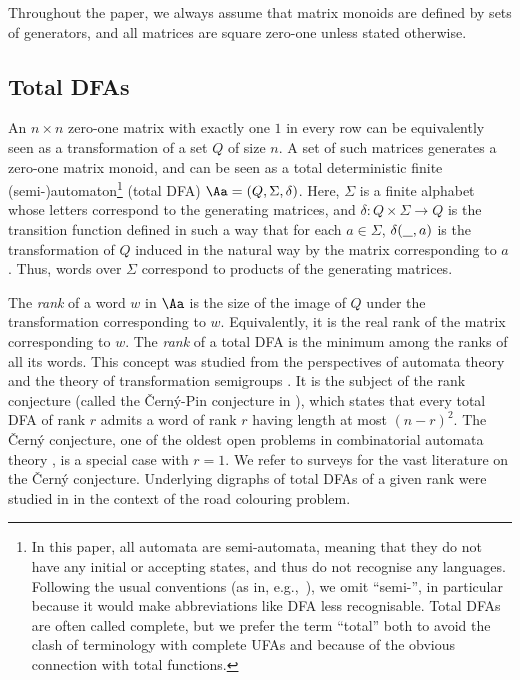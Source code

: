 
Throughout the paper, we always assume that matrix monoids are defined by sets of generators, and 
all matrices are square zero-one unless stated otherwise.

\subsection{Total DFAs}

An $n \times n$ zero-one matrix with exactly one $1$ in every row can be equivalently seen as a transformation of a set $Q$ of size $n$. A set of such matrices generates a zero-one matrix monoid, and can be seen as a total deterministic finite (semi-)automaton\footnote{\label{footnote-semi}In this paper, all automata are semi-automata, meaning that they do not have any initial or accepting states, and thus do not recognise any languages. Following the usual conventions (as in, e.g.,~\cite{Berstel2010}), we omit ``semi-'', in particular because it would make abbreviations like DFA less recognisable. Total DFAs are often called complete, but we prefer the
term “total” both to avoid the clash of terminology with complete UFAs and because of the obvious connection
with total functions.} (total DFA) $\Aa = (Q, \Sigma, \delta)$. Here, $\Sigma$ is a finite alphabet whose letters correspond to the generating matrices, and $\delta: Q \times \Sigma \to Q$ is the transition function defined in such a way that for each $a \in \Sigma$, $\delta(\underline{\hspace{0.25cm}}, a)$ is the transformation of $Q$ induced in the natural way by the matrix corresponding to $a$. Thus, words over $\Sigma$ correspond to products of the generating matrices.

The \emph{rank} of a word $w$ in $\Aa$ is the size of the image of $Q$ under the transformation corresponding to $w$. Equivalently, it is the real rank of the matrix corresponding to $w$.
The \emph{rank} of a total DFA is the minimum among the ranks of all its words. This concept was studied from the perspectives of automata theory \cite{Rystsov1992Rank,Kari2019} and the theory of transformation semigroups \cite{Shin2010Rank,Karimi2017MinIdeal}. It is the subject of the rank conjecture (called the \v{C}ern\'{y}-Pin conjecture in \cite{Rystsov1992Rank}), which states that every total DFA of rank $r$ admits a word of rank $r$ having length at most $(n - r)^2$. The \v{C}ern\'{y} conjecture, one of the oldest open problems in combinatorial automata theory \cite{Volkov2022}, is a special case with $r = 1$. We refer to surveys \cite{Volkov2008,Beal2016,Kari2019,Volkov2022} for the vast literature on the \v{C}ern\'{y} conjecture. Underlying digraphs of total DFAs of a given rank were studied in \cite{Budzban2011Generalized,Beal2016} in the context of the road colouring problem.

